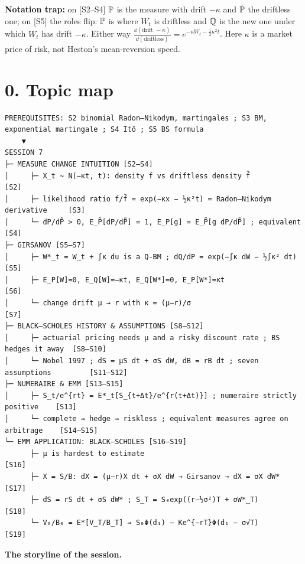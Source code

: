 \documentclass[10pt]{article}
\begin{document}
\textbf{Notation trap:} on [S2--S4] $\mathbb{P}$ is the measure with drift $-\kappa$ and $\tilde{\mathbb{P}}$ the driftless one; on [S5] the roles flip: $\mathbb{P}$ is where $W_t$ is driftless and $\mathbb{Q}$ is the new one under which $W_t$ has drift $-\kappa$. Either way $\frac{\dd(\text{drift }-\kappa)}{\dd(\text{driftless})}=e^{-\kappa W_t-\frac12\kappa^2t}$. Here $\kappa$ is a market price of risk, not Heston's mean-reversion speed.

\section*{0. Topic map}
\begin{lstlisting}
PREREQUISITES: S2 binomial Radon–Nikodym, martingales ; S3 BM, exponential martingale ; S4 Itô ; S5 BS formula
    ▼
SESSION 7
├─ MEASURE CHANGE INTUITION [S2–S4]
│     ├─ X_t ~ N(−κt, t): density f vs driftless density f̃                     [S2]
│     ├─ likelihood ratio f/f̃ = exp(−κx − ½κ²t) = Radon–Nikodym derivative     [S3]
│     └─ dP/dP̃ > 0, E_P̃[dP/dP̃] = 1, E_P[g] = E_P̃[g dP/dP̃] ; equivalent        [S4]
├─ GIRSANOV [S5–S7]
│     ├─ W*_t = W_t + ∫κ du is a Q-BM ; dQ/dP = exp(−∫κ dW − ½∫κ² dt)            [S5]
│     ├─ E_P[W]=0, E_Q[W]=−κt, E_Q[W*]=0, E_P[W*]=κt                             [S6]
│     └─ change drift μ → r with κ = (μ−r)/σ                                     [S7]
├─ BLACK–SCHOLES HISTORY & ASSUMPTIONS [S8–S12]
│     ├─ actuarial pricing needs μ and a risky discount rate ; BS hedges it away  [S8–S10]
│     └─ Nobel 1997 ; dS = μS dt + σS dW, dB = rB dt ; seven assumptions         [S11–S12]
├─ NUMERAIRE & EMM [S13–S15]
│     ├─ S_t/e^{rt} = E*_t[S_{t+Δt}/e^{r(t+Δt)}] ; numeraire strictly positive    [S13]
│     └─ complete ⇒ hedge ⇒ riskless ; equivalent measures agree on arbitrage    [S14–S15]
└─ EMM APPLICATION: BLACK–SCHOLES [S16–S19]
      ├─ μ is hardest to estimate                                                [S16]
      ├─ X = S/B: dX = (μ−r)X dt + σX dW → Girsanov → dX = σX dW*               [S17]
      ├─ dS = rS dt + σS dW* ; S_T = S₀exp((r−½σ²)T + σW*_T)                     [S18]
      └─ V₀/B₀ = E*[V_T/B_T] ⇒ S₀Φ(d₁) − Ke^{−rT}Φ(d₁ − σ√T)                     [S19]
\end{lstlisting}
\textbf{The storyline of the session.}
\end{document}
